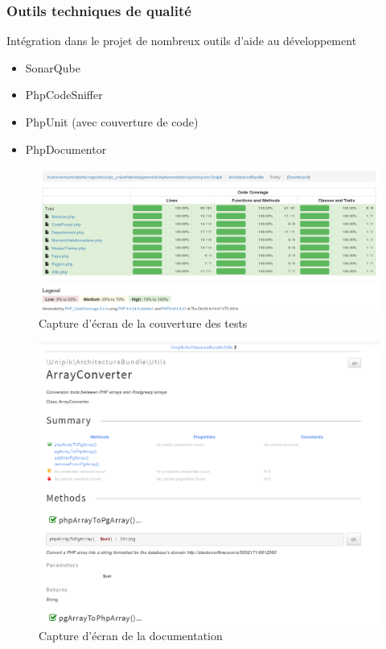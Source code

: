 \speaker{\Matthieu}

\begin{frame}
\frametitle{Outils techniques de qualité}
\begin{block}{Intégration dans le projet de nombreux outils d'aide au développement}
	\begin{itemize}
		\item SonarQube
		\item PhpCodeSniffer
		\item PhpUnit (avec couverture de code)
		\item PhpDocumentor
	\end{itemize}
\end{block}
\end{frame}

\begin{frame}
      \begin{figure}[r]
		\includegraphics[scale=0.3]{images/coverage.png}
		\caption{Capture d'écran de la couverture des tests}
	  \end{figure}
\end{frame}

\begin{frame}
      \begin{figure}[r]
		\includegraphics[scale=0.2]{images/doc.png}
		\caption{Capture d'écran de la documentation}
	  \end{figure}
\end{frame}


